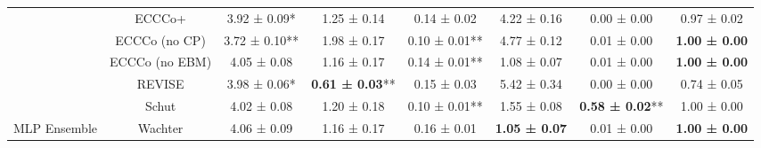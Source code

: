 \begin{table}
{\begin{tabular}[t]{cccccccc}
 & ECCCo+ & 3.92 ± 0.09*\hphantom{*} & 1.25 ± 0.14\hphantom{*}\hphantom{*} & 0.14 ± 0.02\hphantom{*}\hphantom{*} & 4.22 ± 0.16\hphantom{*}\hphantom{*} & 0.00 ± 0.00\hphantom{*}\hphantom{*} & 0.97 ± 0.02\hphantom{*}\hphantom{*}\\

 & ECCCo (no CP) & 3.72 ± 0.10** & 1.98 ± 0.17\hphantom{*}\hphantom{*} & 0.10 ± 0.01** & 4.77 ± 0.12\hphantom{*}\hphantom{*} & 0.01 ± 0.00\hphantom{*}\hphantom{*} & \textbf{1.00 ± 0.00}\hphantom{*}\hphantom{*}\\

 & ECCCo (no EBM) & 4.05 ± 0.08\hphantom{*}\hphantom{*} & 1.16 ± 0.17\hphantom{*}\hphantom{*} & 0.14 ± 0.01** & 1.08 ± 0.07\hphantom{*}\hphantom{*} & 0.01 ± 0.00\hphantom{*}\hphantom{*} & \textbf{1.00 ± 0.00}\hphantom{*}\hphantom{*}\\

 & REVISE & 3.98 ± 0.06*\hphantom{*} & \textbf{0.61 ± 0.03}** & 0.15 ± 0.03\hphantom{*}\hphantom{*} & 5.42 ± 0.34\hphantom{*}\hphantom{*} & 0.00 ± 0.00\hphantom{*}\hphantom{*} & 0.74 ± 0.05\hphantom{*}\hphantom{*}\\

 & Schut & 4.02 ± 0.08\hphantom{*}\hphantom{*} & 1.20 ± 0.18\hphantom{*}\hphantom{*} & 0.10 ± 0.01** & 1.55 ± 0.08\hphantom{*}\hphantom{*} & \textbf{0.58 ± 0.02}** & 1.00 ± 0.00\hphantom{*}\hphantom{*}\\

\multirow[t]{-10}{*}{\centering\arraybackslash MLP Ensemble} & Wachter & 4.06 ± 0.09\hphantom{*}\hphantom{*} & 1.16 ± 0.17\hphantom{*}\hphantom{*} & 0.16 ± 0.01\hphantom{*}\hphantom{*} & \textbf{1.05 ± 0.07}\hphantom{*}\hphantom{*} & 0.01 ± 0.00\hphantom{*}\hphantom{*} & \textbf{1.00 ± 0.00}\hphantom{*}\hphantom{*}\\
\bottomrule
\end{tabular}}
\end{table}
